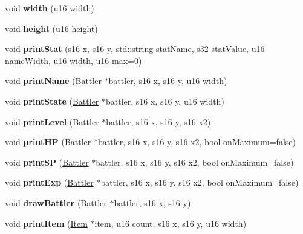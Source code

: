 \begin{DoxyCompactItemize}
\item 
\hypertarget{classWindow_a1d8354a03f5fd148aeebc83c9602a5c9}{void {\bfseries width} (u16 width)}\label{classWindow_a1d8354a03f5fd148aeebc83c9602a5c9}

\item 
\hypertarget{classWindow_a071e45e1e861b032444a078a7241c70b}{void {\bfseries height} (u16 height)}\label{classWindow_a071e45e1e861b032444a078a7241c70b}

\item 
\hypertarget{classWindow_a1c3093631aa79c6038f86b7dc511553c}{void {\bfseries print\-Stat} (s16 x, s16 y, std\-::string stat\-Name, s32 stat\-Value, u16 name\-Width, u16 width, u16 max=0)}\label{classWindow_a1c3093631aa79c6038f86b7dc511553c}

\item 
\hypertarget{classWindow_a4a7493ad69c93233c28a0e1e66b327e3}{void {\bfseries print\-Name} (\hyperlink{classBattler}{Battler} $\ast$battler, s16 x, s16 y, u16 width)}\label{classWindow_a4a7493ad69c93233c28a0e1e66b327e3}

\item 
\hypertarget{classWindow_a5489ce4a2eab4a930d94f852cbba8ee5}{void {\bfseries print\-State} (\hyperlink{classBattler}{Battler} $\ast$battler, s16 x, s16 y, u16 width)}\label{classWindow_a5489ce4a2eab4a930d94f852cbba8ee5}

\item 
\hypertarget{classWindow_a4662dbf66c08dfefcb0a891969235fbf}{void {\bfseries print\-Level} (\hyperlink{classBattler}{Battler} $\ast$battler, s16 x, s16 y, s16 x2)}\label{classWindow_a4662dbf66c08dfefcb0a891969235fbf}

\item 
\hypertarget{classWindow_a63acc98030cfcfa877ffe76b264b7590}{void {\bfseries print\-H\-P} (\hyperlink{classBattler}{Battler} $\ast$battler, s16 x, s16 y, s16 x2, bool on\-Maximum=false)}\label{classWindow_a63acc98030cfcfa877ffe76b264b7590}

\item 
\hypertarget{classWindow_a8d8cf8c7d7450ff5c54f8050d9757463}{void {\bfseries print\-S\-P} (\hyperlink{classBattler}{Battler} $\ast$battler, s16 x, s16 y, s16 x2, bool on\-Maximum=false)}\label{classWindow_a8d8cf8c7d7450ff5c54f8050d9757463}

\item 
\hypertarget{classWindow_a90b7b925030c07f9d26ac5eb1e2ac54a}{void {\bfseries print\-Exp} (\hyperlink{classBattler}{Battler} $\ast$battler, s16 x, s16 y, s16 x2, bool on\-Maximum=false)}\label{classWindow_a90b7b925030c07f9d26ac5eb1e2ac54a}

\item 
\hypertarget{classWindow_a1faf3d8d1315aff937ff83ca7a7c0e51}{void {\bfseries draw\-Battler} (\hyperlink{classBattler}{Battler} $\ast$battler, s16 x, s16 y)}\label{classWindow_a1faf3d8d1315aff937ff83ca7a7c0e51}

\item 
\hypertarget{classWindow_aef2352043900c81f90b9c8bde9b509bf}{void {\bfseries print\-Item} (\hyperlink{classItem}{Item} $\ast$item, u16 count, s16 x, s16 y, u16 width)}\label{classWindow_aef2352043900c81f90b9c8bde9b509bf}

\end{DoxyCompactItemize}
